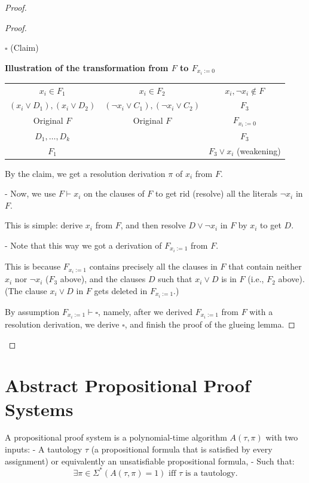 \begin{proof}
\begin{proof}
\begin{enumerate}
    \hfill $\square$ (Claim)
\end{enumerate}

\textbf{Illustration of the transformation from $F$ to $F_{x_i := 0}$}

\begin{center}
\begin{tabular}{c c c}
    $x_i \in F_1$ & $x_i \in F_2$ & $x_i, \neg x_i \notin F$ \\
    $(x_i \lor D_1), (x_i \lor D_2)$ & $(\neg x_i \lor C_1), (\neg x_i \lor C_2)$ & $F_3$ \\
    Original $F$ & Original $F$ & $F_{x_i := 0}$ \\
    $D_1, \dots, D_k$ & & $F_3$ \\
    $F_1$ & & $F_3 \lor x_i$ (weakening) \\
\end{tabular}
\end{center}

By the claim, we get a resolution derivation $\pi$ of $x_i$ from $F$.
 

- Now, we use $F \vdash x_i$ on the clauses of $F$ to get rid (resolve) all the literals $\neg x_i$ in $F$.

  This is simple: derive $x_i$ from $F$, and then resolve $D \lor \neg x_i$ in $F$ by $x_i$ to get $D$.

- Note that this way we got a derivation of $F_{x_i := 1}$ from $F$.

  This is because $F_{x_i := 1}$ contains precisely all the clauses in $F$ that contain neither $x_i$ nor $\neg x_i$ ($F_3$ above), and the clauses $D$ such that $x_i \lor D$ is in $F$ (i.e., $F_2$ above).  
  (The clause $x_i \lor D$ in $F$ gets deleted in $F_{x_i := 1}$.)

 
By assumption $F_{x_i := 1} \vdash \square$, namely, after we derived $F_{x_i := 1}$ from $F$ with a resolution derivation, we derive $\square$, and finish the proof of the glueing lemma.
\end{proof} %
\end{proof} %
 


\section{Abstract Propositional Proof Systems}

\begin{definition}
A propositional proof system is a polynomial-time algorithm $A(\tau, \pi)$ with two inputs:  
- A tautology $\tau$ (a propositional formula that is satisfied by every assignment) or equivalently an unsatisfiable propositional formula,  
- Such that:  
\[
\exists \pi \in \Sigma^* (A(\tau, \pi) = 1) \text{ iff } \tau \text{ is a tautology}.
\]
\end{definition}

